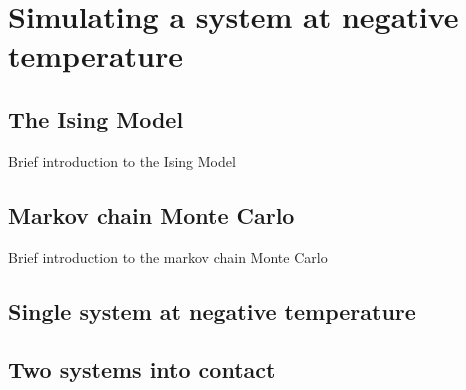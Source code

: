 \chapter{Simulating a system at negative temperature}

\section{The Ising Model}
Brief introduction to the Ising Model

\section{Markov chain Monte Carlo}
Brief introduction to the markov chain Monte Carlo

\section{Single system at negative temperature}

\section{Two systems into contact}